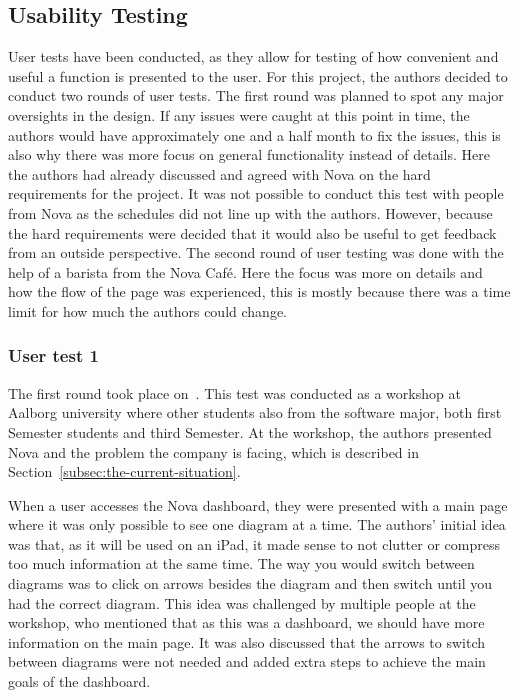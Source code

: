 \subsection{Usability Testing}\label{subsec:usability-tests}

User tests have been conducted, as they allow for testing of how convenient
and useful a function is presented to the user.
For this project, the authors decided to conduct two rounds of user tests.
The first round was planned to spot any major oversights in the design.
If any issues were caught at this point in time, the authors would have approximately one and a half month
to fix the issues, this is also why there was more focus on general functionality instead of details.
Here the authors had already discussed and agreed with Nova on the hard requirements for the project.
It was not possible to conduct this test with people from Nova as the schedules did not line up with the authors.
However, because the hard requirements were decided that it would also be useful to get feedback
from an outside perspective.
The second round of user testing was done with the help of a barista from the Nova Café.
Here the focus was more on details and how the flow of the page was experienced, this is mostly because there was
a time limit for how much the authors could change.

\subsubsection{User test 1}\label{subsubsec:user-test-1}

The first round took place on~.
This test was conducted as a workshop at Aalborg university where other students also from the software major,
both first Semester students and third Semester.
At the workshop, the authors presented Nova and the problem the company is facing, which is described in
Section~\ref{subsec:the-current-situation}.

When a user accesses the Nova dashboard, they were presented with a main page where it was only possible to see
one diagram at a time.
The authors' initial idea was that, as it will be used on an iPad, it made sense to not clutter or compress too
much information at the same time.
The way you would switch between diagrams was to click on arrows besides the diagram and then switch until you had
the correct diagram.
This idea was challenged by multiple people at the workshop, who mentioned that as this was a dashboard, we should
have more information on the main page.
It was also discussed that the arrows to switch between diagrams were not needed and added extra steps to achieve
the main goals of the dashboard.


